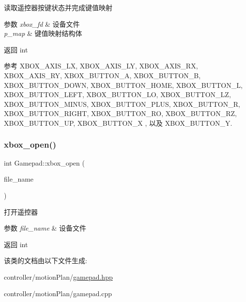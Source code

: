 读取遥控器按键状态并完成键值映射 


\begin{DoxyParams}{参数}
{\em xbox\+\_\+fd} & 设备文件 \\
\hline
{\em p\+\_\+map} & 键值映射结构体 \\
\hline
\end{DoxyParams}
\begin{DoxyReturn}{返回}
int 
\end{DoxyReturn}


参考 X\+B\+O\+X\+\_\+\+A\+X\+I\+S\+\_\+\+LX, X\+B\+O\+X\+\_\+\+A\+X\+I\+S\+\_\+\+LY, X\+B\+O\+X\+\_\+\+A\+X\+I\+S\+\_\+\+RX, X\+B\+O\+X\+\_\+\+A\+X\+I\+S\+\_\+\+RY, X\+B\+O\+X\+\_\+\+B\+U\+T\+T\+O\+N\+\_\+A, X\+B\+O\+X\+\_\+\+B\+U\+T\+T\+O\+N\+\_\+B, X\+B\+O\+X\+\_\+\+B\+U\+T\+T\+O\+N\+\_\+\+D\+O\+WN, X\+B\+O\+X\+\_\+\+B\+U\+T\+T\+O\+N\+\_\+\+H\+O\+ME, X\+B\+O\+X\+\_\+\+B\+U\+T\+T\+O\+N\+\_\+L, X\+B\+O\+X\+\_\+\+B\+U\+T\+T\+O\+N\+\_\+\+L\+E\+FT, X\+B\+O\+X\+\_\+\+B\+U\+T\+T\+O\+N\+\_\+\+LO, X\+B\+O\+X\+\_\+\+B\+U\+T\+T\+O\+N\+\_\+\+LZ, X\+B\+O\+X\+\_\+\+B\+U\+T\+T\+O\+N\+\_\+\+M\+I\+N\+US, X\+B\+O\+X\+\_\+\+B\+U\+T\+T\+O\+N\+\_\+\+P\+L\+US, X\+B\+O\+X\+\_\+\+B\+U\+T\+T\+O\+N\+\_\+R, X\+B\+O\+X\+\_\+\+B\+U\+T\+T\+O\+N\+\_\+\+R\+I\+G\+HT, X\+B\+O\+X\+\_\+\+B\+U\+T\+T\+O\+N\+\_\+\+RO, X\+B\+O\+X\+\_\+\+B\+U\+T\+T\+O\+N\+\_\+\+RZ, X\+B\+O\+X\+\_\+\+B\+U\+T\+T\+O\+N\+\_\+\+UP, X\+B\+O\+X\+\_\+\+B\+U\+T\+T\+O\+N\+\_\+X , 以及 X\+B\+O\+X\+\_\+\+B\+U\+T\+T\+O\+N\+\_\+Y.

\mbox{\label{classquadruped_1_1Gamepad_a45193124f6e45a794fff7770d48bb1c4}} 
\subsubsection{\texorpdfstring{xbox\+\_\+open()}{xbox\_open()}}
{\footnotesize\ttfamily int Gamepad\+::xbox\+\_\+open (\begin{DoxyParamCaption}\item[{const char $\ast$}]{file\+\_\+name }\end{DoxyParamCaption})}



打开遥控器 


\begin{DoxyParams}{参数}
{\em file\+\_\+name} & 设备文件 \\
\hline
\end{DoxyParams}
\begin{DoxyReturn}{返回}
int 
\end{DoxyReturn}


该类的文档由以下文件生成\+:\begin{DoxyCompactItemize}
\item 
controller/motion\+Plan/\hyperlink{gamepad_8hpp}{gamepad.\+hpp}\item 
controller/motion\+Plan/gamepad.\+cpp\end{DoxyCompactItemize}
